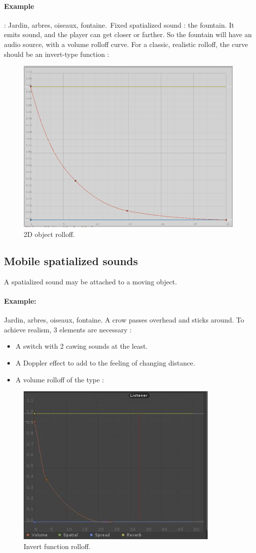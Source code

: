 \documentclass[a4paper,10pt]{article}
\begin{document}
\paragraph{Example} : Jardin, arbres, oiseaux, fontaine.\
Fixed spatialized sound : the fountain. It emits sound, and the player can get closer or farther. So the fountain will have an audio source, with a volume rolloff curve. For a classic, realistic rolloff, the curve should be an invert-type function : \

\begin{figure}[h]
\centering
\caption{2D object rolloff.}
\includegraphics[width=0.5\linewidth]{logRolloff}
\end{figure}



\subsection{Mobile spatialized sounds}
A spatialized sound may be attached to a moving object.
\paragraph{Example: } Jardin, arbres, oiseaux, fontaine. A crow passes overhead and sticks around. To achieve realism, 3 elements are necessary : 
\begin{itemize}
\item A switch with 2 cawing sounds at the least.
\item A Doppler effect to add to the feeling of changing distance.
\item A volume rolloff of the type :\
\end{itemize}

\begin{figure}[h]
\centering
\caption{Invert function rolloff.}
\includegraphics[width=0.4\linewidth]{dopplerRolloff}
\end{figure}




\appendix
\end{document}

